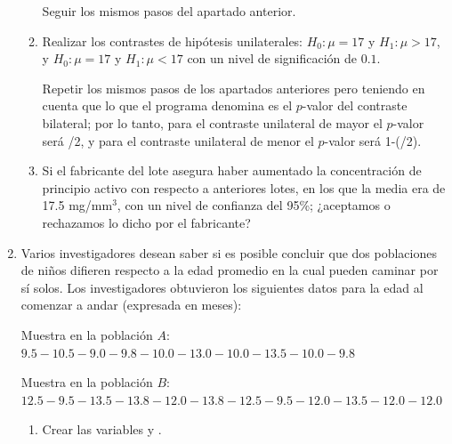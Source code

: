 \begin{enumerate}[leftmargin=*]
\begin{enumerate}
\begin{indicacion}Seguir los mismos pasos del apartado anterior.
\end{indicacion}

\item Realizar los contrastes de hipótesis unilaterales: $H_0:
\mu=17$ y $H_1:\mu>17$, y  $H_0:\mu=17$ y $H_1:\mu<17$
con un nivel de significación de $0.1$.
\begin{indicacion}
Repetir los mismos pasos de los apartados anteriores pero teniendo en cuenta que lo que el programa denomina
 es el $p$-valor del contraste bilateral; por lo tanto, para el contraste unilateral de mayor
el $p$-valor será /2, y para el contraste unilateral de menor el $p$-valor será
1-(/2).
\end{indicacion}

\item Si el fabricante del lote asegura haber aumentado la
concentración de principio activo con respecto a anteriores lotes,
en los que la media era de 17.5 mg/mm$^3$, con un nivel de
confianza del 95\%; ¿aceptamos o rechazamos lo dicho por el
fabricante?

\end{enumerate}

\item Varios investigadores desean saber si es posible concluir que dos poblaciones de niños difieren respecto a la edad promedio en la cual pueden caminar por sí solos. Los investigadores obtuvieron los siguientes datos para la edad al comenzar a andar (expresada en meses):

Muestra en la población $A$:
$9.5-10.5-9.0-9.8-10.0-13.0-10.0-13.5-10.0-9.8$

Muestra en la población $B$:
$12.5-9.5-13.5-13.8-12.0-13.8-12.5-9.5-12.0-13.5-12.0-12.0$

\begin{enumerate}

\item Crear las variables  y .


\end{enumerate}
\end{enumerate}

